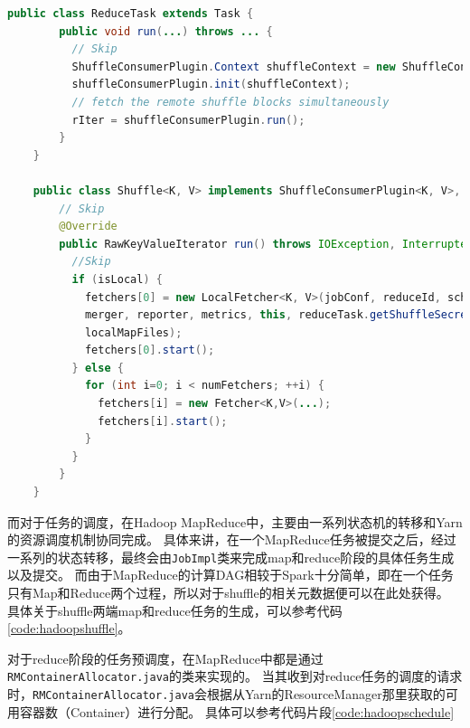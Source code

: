 \begin{lstlisting}[language={Java}, caption={Hadoop MapReduce中Reduce阶段的shuffle读代码片段}, label={code:hadoopreduce}]
    public class ReduceTask extends Task {
        public void run(...) throws ... {
          // Skip
          ShuffleConsumerPlugin.Context shuffleContext = new ShuffleConsumerPlugin.Context(...);
          shuffleConsumerPlugin.init(shuffleContext);
          // fetch the remote shuffle blocks simultaneously
          rIter = shuffleConsumerPlugin.run();
        }
    }

    public class Shuffle<K, V> implements ShuffleConsumerPlugin<K, V>, ExceptionReporter {
        // Skip
        @Override
        public RawKeyValueIterator run() throws IOException, InterruptedException {
          //Skip
          if (isLocal) {
            fetchers[0] = new LocalFetcher<K, V>(jobConf, reduceId, scheduler,
            merger, reporter, metrics, this, reduceTask.getShuffleSecret(),
            localMapFiles);
            fetchers[0].start();
          } else {
            for (int i=0; i < numFetchers; ++i) {
              fetchers[i] = new Fetcher<K,V>(...);
              fetchers[i].start();
            }
          }
        }
    }
\end{lstlisting}

而对于任务的调度，在Hadoop MapReduce中，主要由一系列状态机的转移和Yarn\cite{yarn}的资源调度机制协同完成。
具体来讲，在一个MapReduce任务被提交之后，经过一系列的状态转移，最终会由\verb|JobImpl|类来完成map和reduce阶段的具体任务生成以及提交。
而由于MapReduce的计算DAG相较于Spark十分简单，即在一个任务只有Map和Reduce两个过程，所以对于shuffle的相关元数据便可以在此处获得。
具体关于shuffle两端map和reduce任务的生成，可以参考代码\ref{code:hadoopshuffle}。

对于reduce阶段的任务预调度，在MapReduce中都是通过\verb|RMContainerAllocator.java|的类来实现的。
当其收到对reduce任务的调度的请求时，\verb|RMContainerAllocator.java|会根据从Yarn的ResourceManager那里获取的可用容器数（Container）进行分配。
具体可以参考代码片段\ref{code:hadoopschedule}


